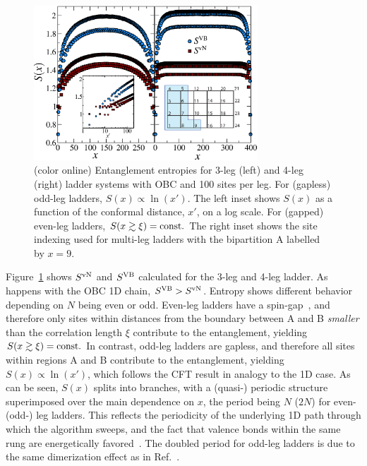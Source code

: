 \documentclass[prl,aps,twocolumn,floatfix,amsmath,amssymb,superscriptaddress,tightenlines]{revtex4}
\begin{document}
\begin{figure} { \includegraphics[width=3.3in]{FIG23NEW.eps}
\caption{(color online) Entanglement entropies for 3-leg (left)
and 4-leg (right) ladder systems with OBC and 100 sites per leg.  For
(gapless) odd-leg ladders, $S(x)\propto\ln(x')$.  The left
inset shows $S(x)$ as a function of the conformal distance, $x'$, on a log
scale. For (gapped) even-leg ladders, $S(x\gtrsim\xi)= {\rm const}.$
The right inset shows the site indexing used for multi-leg ladders with the
bipartition A labelled by $x=9$.  \label{ladder} }} \end{figure}

Figure~\ref{ladder} shows $S^{ \rm vN}$ and $S^{\rm VB}$ calculated
for the 3-leg and 4-leg ladder. As happens with the OBC 1D chain, $S^{\rm VB} > S^{ \rm vN}$.  
Entropy shows different behavior depending on
$N$ being even or odd.  Even-leg ladders have a
spin-gap~\cite{White1994}, and therefore only sites within distances from
the boundary between A and B {\it smaller} than the correlation length
$\xi$ contribute to the entanglement, yielding $S(x\gtrsim \xi)= {\rm
const}.$ In contrast, odd-leg ladders are gapless, and therefore all
sites within regions A and B contribute to the entanglement, 
yielding $S(x)\propto\ln(x')$, 
which follows the CFT result in
analogy to the 1D case. As can be seen, $S(x)$ splits into branches, with a
(quasi-) periodic structure superimposed over the main dependence on $x$,
the period being $N$ ($2N$) for even- (odd-) leg ladders. This reflects the
periodicity of the underlying 1D path through which the algorithm sweeps, and the fact that
valence bonds within the same rung are energetically
favored~\cite{White1994}. The doubled period for odd-leg ladders
is due to the same dimerization effect as in Ref.~\cite{Ian1}.
\end{document}
